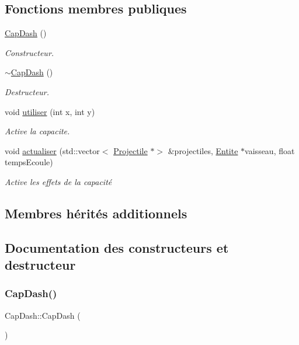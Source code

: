 \subsection*{Fonctions membres publiques}
\begin{DoxyCompactItemize}
\item 
\hyperlink{class_cap_dash_ac38287e31284b6b5ac8add730830bfed}{Cap\+Dash} ()
\begin{DoxyCompactList}\small\item\em Constructeur. \end{DoxyCompactList}\item 
\hyperlink{class_cap_dash_aa935262b9ebdaf197294aba7211663cc}{$\sim$\+Cap\+Dash} ()
\begin{DoxyCompactList}\small\item\em Destructeur. \end{DoxyCompactList}\item 
void \hyperlink{class_cap_dash_a82823122659ff5a87a09e9ddf0e3dabb}{utiliser} (int x, int y)
\begin{DoxyCompactList}\small\item\em Active la capacite. \end{DoxyCompactList}\item 
void \hyperlink{class_cap_dash_ad4f99cef49151c1072a11af18852fa7b}{actualiser} (std\+::vector$<$ \hyperlink{class_projectile}{Projectile} $\ast$$>$ \&projectiles, \hyperlink{class_entite}{Entite} $\ast$vaisseau, float temps\+Ecoule)
\begin{DoxyCompactList}\small\item\em Active les effets de la capacité \end{DoxyCompactList}\end{DoxyCompactItemize}
\subsection*{Membres hérités additionnels}


\subsection{Documentation des constructeurs et destructeur}
\mbox{\label{class_cap_dash_ac38287e31284b6b5ac8add730830bfed}} 
\subsubsection{\texorpdfstring{Cap\+Dash()}{CapDash()}}
{\footnotesize\ttfamily Cap\+Dash\+::\+Cap\+Dash (\begin{DoxyParamCaption}{ }\end{DoxyParamCaption})}



